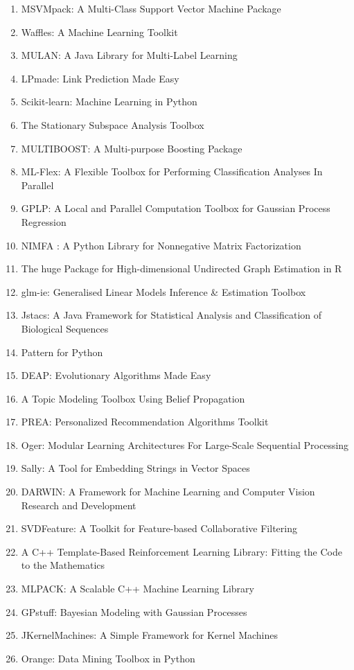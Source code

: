 \documentclass[a4paper,12pt,oneside]{book}
\begin{document}
\begin{enumerate}
\item MSVMpack: A Multi-Class Support Vector Machine Package
\item Waffles: A Machine Learning Toolkit
\item MULAN: A Java Library for Multi-Label Learning
\item LPmade: Link Prediction Made Easy
\item Scikit-learn: Machine Learning in Python
\item The Stationary Subspace Analysis Toolbox
\item MULTIBOOST: A Multi-purpose Boosting Package
\item ML-Flex: A Flexible Toolbox for Performing Classification Analyses In Parallel
\item GPLP: A Local and Parallel Computation Toolbox for Gaussian Process Regression
\item NIMFA : A Python Library for Nonnegative Matrix Factorization
\item The huge Package for High-dimensional Undirected Graph Estimation in R
\item glm-ie: Generalised Linear Models Inference \& Estimation Toolbox
\item Jstacs: A Java Framework for Statistical Analysis and Classification of Biological Sequences
\item Pattern for Python
\item DEAP: Evolutionary Algorithms Made Easy
\item A Topic Modeling Toolbox Using Belief Propagation
\item PREA: Personalized Recommendation Algorithms Toolkit
\item Oger: Modular Learning Architectures For Large-Scale Sequential Processing
\item Sally: A Tool for Embedding Strings in Vector Spaces
\item DARWIN: A Framework for Machine Learning and Computer Vision Research and Development
\item SVDFeature: A Toolkit for Feature-based Collaborative Filtering
\item A C++ Template-Based Reinforcement Learning Library: Fitting the Code to the Mathematics
\item MLPACK: A Scalable C++ Machine Learning Library
\item GPstuff: Bayesian Modeling with Gaussian Processes
\item JKernelMachines: A Simple Framework for Kernel Machines
\item Orange: Data Mining Toolbox in Python

\end{enumerate}
\end{document}

